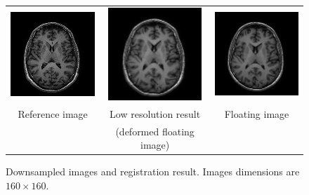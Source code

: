 \begin{figure}[ht]
\begin{center}
\begin{tabular}{ccc}
\includegraphics[width=35mm]{use-examples/applyTrsf-blockmatching/lower-ref.png} &
\includegraphics[width=35mm]{use-examples/applyTrsf-blockmatching/lower-res.png} &
\includegraphics[width=35mm]{use-examples/applyTrsf-blockmatching/lower-flo.png} \\
Reference image &
Low resolution result &
Floating image \\
& (deformed floating image) &
\end{tabular}
\end{center}
\caption{\label{fig:exe:applyTrsf:blockmatching:2} Downsampled images and registration result. Images dimensions are $160 \times 160$.}
\end{figure}

